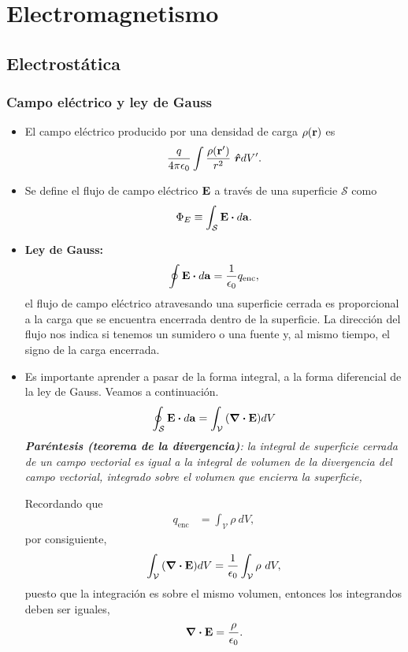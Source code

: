 \chapter{Electromagnetismo}
\section{Electrostática}
\subsection{Campo eléctrico y ley de Gauss}
\begin{itemize}
\item El campo eléctrico producido por una densidad de carga $\rho(\vb{r})$
es
\begin{align}
\frac{q}{4\pi \epsilon_0}\int \frac{\rho(\vb{r}')}{r^2}\ \boldsymbol{\hat{r}}dV'.
\end{align}

\item Se define el flujo de campo eléctrico $\vb{E}$ a través de 
una superficie $\mathcal{S}$ como
\begin{align}
\Phi_E\equiv\int _{\mathcal{S}}\vb{E}\vdot d\vb{a}.
\end{align}

\item \textbf{Ley de Gauss:}
\begin{align}
\oint \vb{E}\vdot d\vb{a}=\frac{1}{\ep}q_{\text{enc}},
\end{align}
el flujo de campo eléctrico atravesando una superficie cerrada
es proporcional a la carga que se encuentra encerrada dentro 
de la superficie. La dirección del flujo nos indica si tenemos un 
sumidero o una fuente y, al mismo tiempo, el signo de la carga
encerrada.

\item Es importante aprender a pasar de la forma integral, a la forma
diferencial de la ley de Gauss. Veamos a continuación. 
\begin{align*}
\oint_{\mathcal{S}} \vb{E}\vdot d\vb{a}=\int_{\mathcal{V}}
\qty(\div{\vb{E}})dV
\end{align*}
\textit{\textbf{Paréntesis (teorema de la divergencia)}: la integral 
de superficie cerrada de un campo vectorial es igual a la integral 
de volumen de la divergencia del campo vectorial, integrado sobre
el volumen que encierra la superficie,}

Recordando que 
\begin{align*}
q_{\text{enc}}&=\int_{\mathcal{V}}\rho \ dV,
\end{align*}
por consiguiente, 
\begin{align*}
\int_{\mathcal{V}}\qty(\div{\vb{E}})dV=
\frac{1}{\epsilon_0}\int_{\mathcal{V}}\rho \ dV,
\end{align*}
puesto que la integración es sobre el mismo volumen, entonces
los integrandos deben ser iguales,
\begin{align}
\div{\vb{E}}=\frac{\rho}{\epsilon_0}.
\end{align}


\end{itemize}
